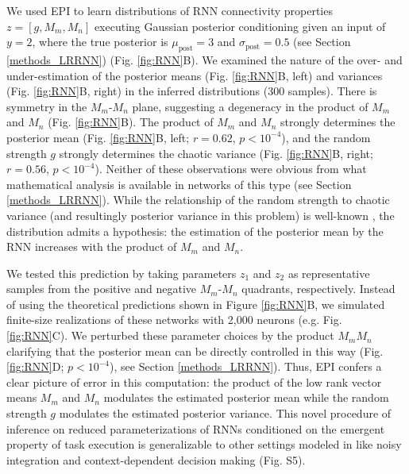 \documentclass[11pt]{article}
\begin{document}
We used EPI to learn distributions of RNN connectivity properties $z = [g, M_m, M_n]$ executing Gaussian posterior conditioning given an input of $y=2$, where the true posterior is $\mu_{\text{post}}=3$ and $\sigma_{\text{post}} = 0.5$ (see Section \ref{methods_LRRNN}) (Fig. \ref{fig:RNN}B). 
We examined the nature of the over- and under-estimation of the posterior means (Fig. \ref{fig:RNN}B, left) and variances (Fig. \ref{fig:RNN}B, right) in the inferred distributions (300 samples).  
There is symmetry in the $M_m$-$M_n$ plane, suggesting a degeneracy in the product of $M_m$ and $M_n$ (Fig. \ref{fig:RNN}B).  
The product of $M_m$ and $M_n$ strongly determines the posterior mean (Fig. \ref{fig:RNN}B, left; $r=0.62$,  $p<10^{-4}$), and the random strength $g$ strongly determines the chaotic variance (Fig. \ref{fig:RNN}B, right; $r=0.56$,  $p<10^{-4}$).
Neither of these observations were obvious from what mathematical analysis is available in networks of this type (see Section \ref{methods_LRRNN}).  
While the relationship of the random strength to chaotic variance (and resultingly posterior variance in this problem) is well-known \cite{sompolinsky1988chaos}, the distribution admits a hypothesis: the estimation of the posterior mean by the RNN increases with the product of $M_m$ and $M_n$.

We tested this prediction by taking parameters $z_1$ and $z_2$ as representative samples from the positive and negative $M_m$-$M_n$ quadrants, respectively.
Instead of using the theoretical predictions shown in Figure \ref{fig:RNN}B, we simulated finite-size realizations of these networks with 2,000 neurons (e.g. Fig. \ref{fig:RNN}C).  
We perturbed these parameter choices by the product $M_m M_n$ clarifying that the posterior mean can be directly controlled in this way (Fig. \ref{fig:RNN}D; $p<10^{-4}$), see Section \ref{methods_LRRNN}).
Thus, EPI confers a clear picture of error in this computation: the product of the low rank vector means $M_m$ and $M_n$ modulates the estimated posterior mean while the random strength $g$ modulates the estimated posterior variance.
This novel procedure of inference on reduced parameterizations of RNNs conditioned on the emergent property of task execution is generalizable to other settings modeled in \cite{mastrogiuseppe2018linking} like noisy integration and context-dependent decision making (Fig. S5).
\end{document}
